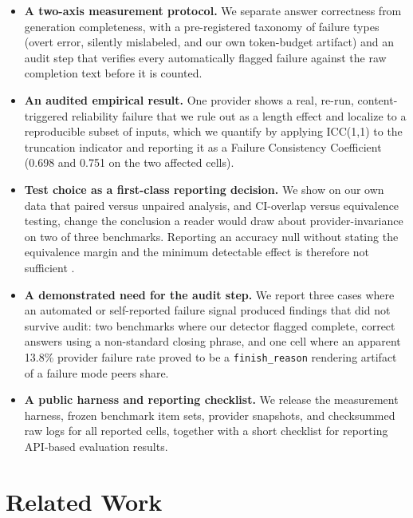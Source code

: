 \documentclass[11pt]{article}
\begin{document}
\begin{itemize}[itemsep=2pt, topsep=3pt, parsep=1pt]
\item \textbf{A two-axis measurement protocol.} We separate answer
  correctness from generation completeness, with a pre-registered
  taxonomy of failure types (overt error, silently mislabeled, and
  our own token-budget artifact) and an audit step that verifies every
  automatically flagged failure against the raw completion text before
  it is counted.

\item \textbf{An audited empirical result.} One provider shows a real,
  re-run, content-triggered reliability failure that we rule out as a
  length effect and localize to a reproducible subset of inputs, which
  we quantify by applying ICC(1,1) \citep{shrout1979icc} to the
  truncation indicator and reporting it as a Failure Consistency
  Coefficient (0.698 and 0.751 on the two affected cells).

\item \textbf{Test choice as a first-class reporting decision.} We show
  on our own data that paired versus unpaired analysis, and
  CI-overlap versus equivalence testing, change the conclusion a
  reader would draw about provider-invariance on two of three
  benchmarks. Reporting an accuracy null without stating the
  equivalence margin and the minimum detectable effect is therefore
  not sufficient \citep{card2020power, lakens2017tost}.

\item \textbf{A demonstrated need for the audit step.} We report three
  cases where an automated or self-reported failure signal produced
  findings that did not survive audit: two benchmarks where our
  detector flagged complete, correct answers using a non-standard
  closing phrase, and one cell where an apparent 13.8\% provider
  failure rate proved to be a \texttt{finish\_reason} rendering
  artifact of a failure mode peers share.

\item \textbf{A public harness and reporting checklist.} We release
  the measurement harness, frozen benchmark item sets, provider
  snapshots, and checksummed raw logs for all reported cells, together
  with a short checklist for reporting API-based evaluation results.
\end{itemize}

\section{Related Work}
\end{document}
